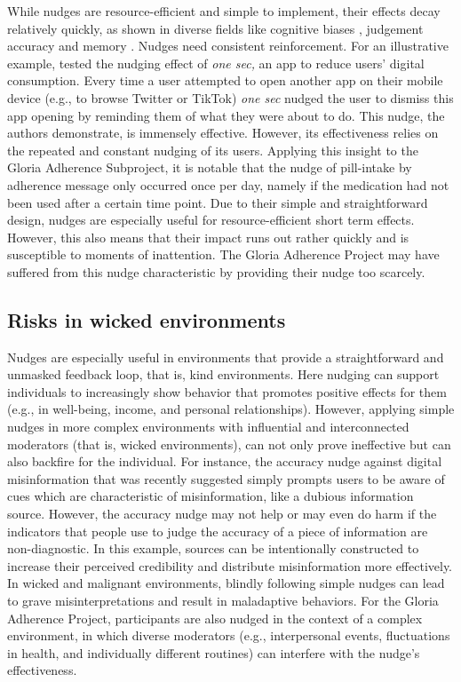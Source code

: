 \documentclass[reflection, authordate]{jote-new-article}
\begin{document}
While nudges are resource-efficient and simple to implement, their effects decay relatively quickly, as shown in diverse fields like cognitive biases \parencites{Grüning2022}, judgement accuracy \parencites{Lorenz-Spreen2021} and memory \parencites{Trammell1992}. Nudges need consistent reinforcement. For an illustrative example, \textcite{Grüning2022a} tested the nudging effect of \emph{one sec,} an app to reduce users’ digital consumption. Every time a user attempted to open another app on their mobile device (e.g., to browse Twitter or TikTok) \emph{one sec} nudged the user to dismiss this app opening by reminding them of what they were about to do. This nudge, the authors demonstrate, is immensely effective. However, its effectiveness relies on the repeated and constant nudging of its users. Applying this insight to the Gloria Adherence Subproject, it is notable that the nudge of pill-intake by adherence message only occurred once per day, namely if the medication had not been used after a certain time point. Due to their simple and straightforward design, nudges are especially useful for resource-efficient short term effects. However, this also means that their impact runs out rather quickly and is susceptible to moments of inattention. The Gloria Adherence Project may have suffered from this nudge characteristic by providing their nudge too scarcely.



\subsection{Risks in wicked environments}



Nudges are especially useful in environments that provide a straightforward and unmasked feedback loop, that is, kind environments. Here nudging can support individuals to increasingly show behavior that promotes positive effects for them (e.g., in well-being, income, and personal relationships). However, applying simple nudges in more complex environments with influential and interconnected moderators (that is, wicked environments), can not only prove ineffective but can also backfire for the individual. For instance, the accuracy nudge against digital misinformation that was recently suggested \parencites[e.g.][]{Pennycook2021}{Lorenz-Spreen2021} simply prompts users to be aware of cues which are characteristic of misinformation, like a dubious information source. However, the accuracy nudge may not help or may even do harm if the indicators that people use to judge the accuracy of a piece of information are non-diagnostic. In this example, sources can be intentionally constructed to increase their perceived credibility and distribute misinformation more effectively. In wicked and malignant environments, blindly following simple nudges can lead to grave misinterpretations and result in maladaptive behaviors. For the Gloria Adherence Project, participants are also nudged in the context of a complex environment, in which diverse moderators (e.g., interpersonal events, fluctuations in health, and individually different routines) can interfere with the nudge’s effectiveness.
\end{document}

